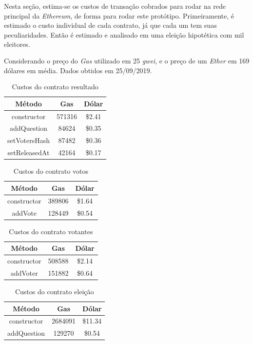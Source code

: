 \documentclass{ufsctex/ufsctex}
\begin{document}
Nesta seção, estima-se os custos de transação cobrados para rodar na rede
principal da \textit{Ethereum}, de forma para rodar este protótipo.
Primeiramente, é estimado o custo individual de cada contrato, já que cada um
tem suas peculiaridades. Então é estimado e analisado em uma eleição hipotética
com mil eleitores.

Considerando o preço do \textit{Gas} utilizado em 25 \textit{gwei}, e o preço de um
\textit{Ether} em 169 dólares em média. Dados obtidos em 25/09/2019.

\begin{table}[htb]
\centering
\begin{tabular}{||c|c|c||}
\hline
	\textbf{Método}        & \textbf{Gas}    & \textbf{Dólar}  \\  [0.2ex] \hline \hline
constructor   & 571316 & \$2.41 \\
addQuestion   & 84624  & \$0.35 \\ 
setVotersHash & 87482  & \$0.36 \\ 
setReleasedAt & 42164  & \$0.17 \\ \hline
\end{tabular}
\caption{Custos do contrato resultado}
\label{tab:my-table}
\end{table}

\begin{table}[htb]
\centering
\begin{tabular}{||c|c|c||}
		\hline
		\textbf{Método} & \textbf{Gas} & \textbf{Dólar}  \\ [0.2ex] \hline \hline
		constructor & 389806 & \$1.64 \\ 
		addVote     & 128449 & \$0.54 \\ \hline
	\end{tabular}
	\caption{Custos do contrato votos}
	\label{tab:my-table}
\end{table}

\begin{table}[htb]
	\centering
	\begin{tabular}{||c|c|c||}
		\hline
		\textbf{Método}  & \textbf{Gas} & \textbf{Dólar}  \\ [0.2ex] \hline \hline
		constructor & 508588 & \$2.14 \\ 
		addVoter    & 151882 & \$0.64 \\ \hline
	\end{tabular}
	\caption{Custos do contrato votantes}
	\label{tab:my-table}
\end{table}

\begin{table}[htb]
	\centering
	\begin{tabular}{||c|c|c||}
		\hline
		\textbf{Método} & \textbf{Gas}  & \textbf{Dólar}   \\ [0.2ex] \hline \hline
		constructor & 2684091 & \$11.34 \\ 
		addQuestion & 129270  & \$0.54  \\ \hline
	\end{tabular}
	\caption{Custos do contrato eleição}
	\label{tab:my-table}
\end{table}
\end{document}
